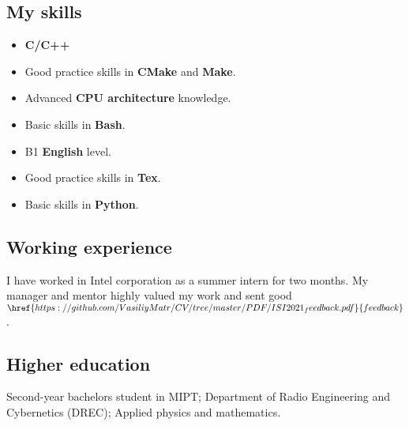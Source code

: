 \begin{minipage}[t]{6.5cm}

\subsection* {My skills}
\begin{itemize}
    \item \textbf{C/C++} \\
    \item Good practice skills in \textbf{CMake} and \textbf{Make}. \\
    \item Advanced \textbf{CPU architecture} knowledge. \\
    \item Basic skills in \textbf{Bash}. \\
    \item B1 \textbf{English} level. \\
    \item Good practice skills in \textbf{Tex}. \\
    \item Basic skills in \textbf{Python}. \\

\end{itemize}

\end{minipage}

\subsection* {Working experience}
I have worked in Intel corporation as a summer intern for two months. My manager and mentor
highly valued my work and sent good
$\href {https://github.com/VasiliyMatr/CV/tree/master/PDF/ISI2021_feedback.pdf}{feedback}$.

\subsection* {Higher education}
Second-year bachelors student in MIPT; Department of Radio Engineering and
Cybernetics (DREC); Applied physics and mathematics.

